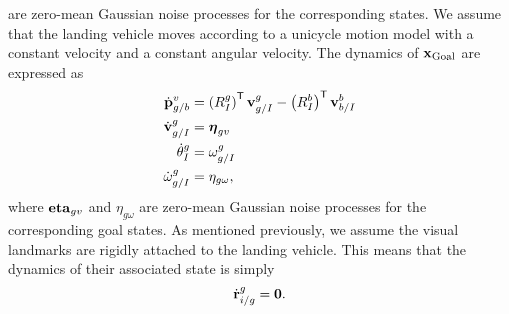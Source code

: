 are zero-mean Gaussian noise processes for the corresponding states.
We assume that the landing vehicle moves according to a unicycle motion model
with a constant velocity and a constant
angular velocity. The dynamics of $\boldsymbol{\mathrm{x}}_{\text{Goal}}$ are expressed as
\begin{align}
  \dot{\vect{p}}_{g/b}^{v} &= \left( R_{I}^{g} \right)^\transpose
  \vect{v}_{g/I}^{g} - \left( R_{I}^{b} \right)^\transpose
  \vect{v}_{b/I}^{b} \label{eq:goal_dynamics} \\
  \dot{\vect{v}}_{g/I}^{g} &= \vect{\eta}_{gv} \nonumber \\
  \dot{\theta}_{I}^{g} &= \omega_{g/I}^g \nonumber \\
  \dot{\omega}_{g/I}^{g} &= \eta_{g\omega} \nonumber,
\end{align}
where $\boldsymbol{\mathrm{eta}}_{gv}$ and $\eta_{g\omega}$ are zero-mean Gaussian noise
processes for the corresponding goal states.
As mentioned previously, we assume the visual landmarks are rigidly
attached to the landing vehicle. This means that the dynamics of their
associated state is simply
\begin{equation}
  \dot{\vect{r}}_{i/g}^g = \vect{0}. \label{eq:landmark_dynamics}
\end{equation}

